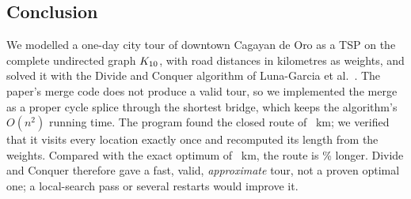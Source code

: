 \subsection{Conclusion}
We modelled a one-day city tour of downtown Cagayan de Oro as a TSP on the complete undirected graph
$K_{10}$, with road distances in kilometres as weights, and solved it with the Divide and
Conquer algorithm of Luna-Garcia et al.~\cite{lunagarcia2024performance}. The paper's merge code does
not produce a valid tour, so we implemented the merge as a proper cycle splice through the shortest
bridge, which keeps the algorithm's $O(n^2)$ running time. The program found the closed route
\DCRoute{} of \DCTotal{}~km; we verified that it visits every location exactly once and recomputed
its length from the weights. Compared with the exact optimum of \OptTotal{}~km, the route is
\DCGap\% longer. Divide and Conquer therefore gave a fast, valid, \emph{approximate} tour, not a
proven optimal one; a local-search pass or several restarts would improve it.
